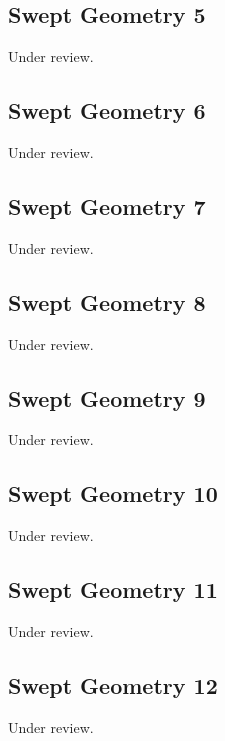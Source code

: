 \documentclass{scrartcl}
\begin{document}
\subsection{Swept Geometry 5} %
\label{sec:swept_5}
Under review.%
\clearpage

\subsection{Swept Geometry 6} %
\label{sec:swept_6}
Under review.%
\clearpage

\subsection{Swept Geometry 7} %
\label{sec:swept_7}
Under review.%
\clearpage

\subsection{Swept Geometry 8} %
\label{sec:swept_8}
Under review.%
\clearpage

\subsection{Swept Geometry 9} %
\label{sec:swept_9}
Under review.%
\clearpage

\subsection{Swept Geometry 10} %
\label{sec:swept_10}
Under review.%
\clearpage

\subsection{Swept Geometry 11} %
\label{sec:swept_11}
Under review.%
\clearpage

\subsection{Swept Geometry 12} %
\label{sec:swept_12}
Under review.%
\clearpage
\end{document}
